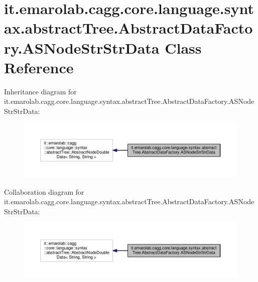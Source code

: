 \hypertarget{classit_1_1emarolab_1_1cagg_1_1core_1_1language_1_1syntax_1_1abstractTree_1_1AbstractDataFactory_1_1ASNodeStrStrData}{\section{it.\-emarolab.\-cagg.\-core.\-language.\-syntax.\-abstract\-Tree.\-Abstract\-Data\-Factory.\-A\-S\-Node\-Str\-Str\-Data Class Reference}
\label{classit_1_1emarolab_1_1cagg_1_1core_1_1language_1_1syntax_1_1abstractTree_1_1AbstractDataFactory_1_1ASNodeStrStrData}
}


Inheritance diagram for it.\-emarolab.\-cagg.\-core.\-language.\-syntax.\-abstract\-Tree.\-Abstract\-Data\-Factory.\-A\-S\-Node\-Str\-Str\-Data\-:\nopagebreak
\begin{figure}[H]
\begin{center}
\leavevmode
\includegraphics[width=350pt]{classit_1_1emarolab_1_1cagg_1_1core_1_1language_1_1syntax_1_1abstractTree_1_1AbstractDataFactory6b02befbce1469ea5eae39f71c0954d2}
\end{center}
\end{figure}


Collaboration diagram for it.\-emarolab.\-cagg.\-core.\-language.\-syntax.\-abstract\-Tree.\-Abstract\-Data\-Factory.\-A\-S\-Node\-Str\-Str\-Data\-:\nopagebreak
\begin{figure}[H]
\begin{center}
\leavevmode
\includegraphics[width=350pt]{classit_1_1emarolab_1_1cagg_1_1core_1_1language_1_1syntax_1_1abstractTree_1_1AbstractDataFactory5c6c3973107602e4fbf4c4f8eaf66601}
\end{center}
\end{figure}

